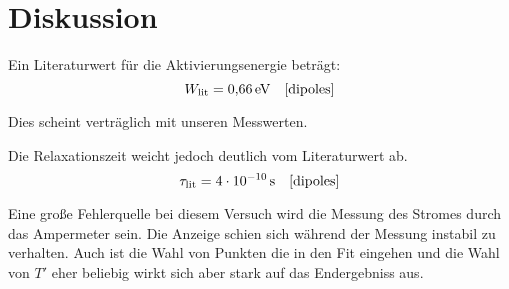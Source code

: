 \section{Diskussion}\label{sec:Diskussion}


Ein Literaturwert für die Aktivierungsenergie beträgt:
\begin{equation}
  W_\text{lit} = \SI{0.66}{\electronvolt} \quad \text{\cite{dipoles}}
\end{equation}

Dies scheint verträglich mit unseren Messwerten.

Die Relaxationszeit weicht jedoch deutlich vom Literaturwert ab.
\begin{equation}
  \tau_\text{lit} = \SI{4E-10}{\second} \quad \text{\cite{dipoles}}
\end{equation}

Eine große Fehlerquelle bei diesem Versuch wird die Messung des Stromes durch das
Ampermeter sein. Die Anzeige schien sich während der Messung instabil zu verhalten.
Auch ist die Wahl von Punkten die in den Fit eingehen und die Wahl von $T'$ eher beliebig
wirkt sich aber stark auf das Endergebniss aus.  
